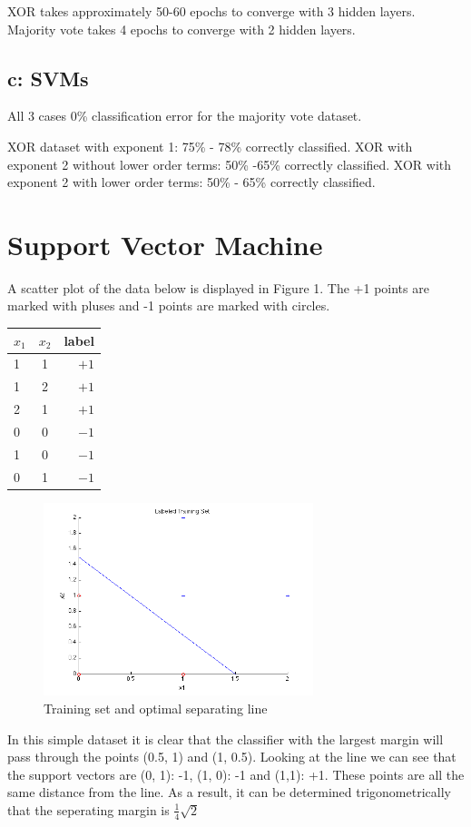 \documentclass{article}
\begin{document}
XOR takes approximately 50-60 epochs to converge with 3 hidden layers. 
Majority vote takes 4 epochs to converge with 2 hidden layers.

\subsection*{c: SVMs}

All 3 cases 0\% classification error for the majority vote dataset. 

XOR dataset with exponent 1: 75\% - 78\% correctly classified.
XOR with exponent 2 without lower order terms: 50\% -65\% correctly classified. 
XOR with exponent 2 with lower order terms: 50\% - 65\% correctly classified. 

\section{Support Vector Machine}

A scatter plot of the data below is displayed in Figure 1. The +1 points are marked with pluses and -1 points are marked with circles.

\begin{center}
  \begin{tabular}{ | l | c | r |}
   \hline
    $x_1$ & $x_2$ & label \\ \hline
    1 & 1 & $+1$\\ 
    1 & 2 & $+1$ \\ 
    2 & 1 & $+1$ \\
    0 & 0 & $-1$ \\ 
    1 & 0 & $-1$ \\ 
    0 & 1 & $-1$ \\ 
    \hline
  \end{tabular}
\end{center}

\begin{figure}[H]
  \centering
      \includegraphics[width=0.7\textwidth]{SVMplot}
  \caption{Training set and optimal separating line}
\end{figure}

In this simple dataset it is clear that the classifier with the largest margin will pass through the points (0.5, 1) and (1, 0.5). 
Looking at the line we can see that the support vectors are (0, 1): -1, (1, 0): -1 and (1,1): +1. 
These points are all the same distance from the line.
As a result, it can be determined trigonometrically that the seperating margin is $\frac{1}{4}\sqrt{2}$
\end{document}
